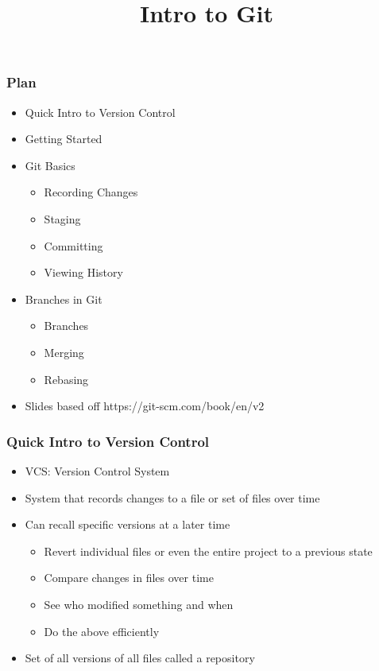 \documentclass{beamer}
\title{Intro to Git}
\date{}
\begin{document}
\frame{\titlepage}

\begin{frame}
	\frametitle{Plan}
	\begin{itemize}
		\item{Quick Intro to Version Control}
		\item{Getting Started}
		\item{Git Basics}
		\begin{itemize}
			\item{Recording Changes}
			\item{Staging}
			\item{Committing}
			\item{Viewing History}
		\end{itemize}
		\item{Branches in Git}
		\begin{itemize}
			\item{Branches}
			\item{Merging}
			\item{Rebasing}
		\end{itemize}
		\item{Slides based off https://git-scm.com/book/en/v2}
	\end{itemize}

\end{frame}


\begin{frame}
	\frametitle{Quick Intro to Version Control}
	\begin{itemize}
		\item{VCS: Version Control System}
		\item{System that records changes to a file or set of files over time}
		\item{Can recall specific versions at a later time}
		\begin{itemize}
			\item{Revert individual files or even the entire project to a previous state}
			\item{Compare changes in files over time}
			\item{See who modified something and when}
			\item{Do the above efficiently}
		\end{itemize}
		\item{Set of all versions of all files called a repository}
	\end{itemize}
\end{frame}
\end{document}
